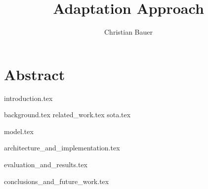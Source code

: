 \documentclass[
a4paper, %
11pt, %
onecolumn, %
openany, %
]{memoir}
\title{Adaptation Approach}
\author{Christian Bauer}
\begin{document}
  \maketitle

  \tableofcontents
  \listoffigures
  \lstlistoflistings

  \section*{Abstract}   




  {introduction.tex}

  {background.tex}
  {related_work.tex}
  {sota.tex}

  {model.tex}

  {architecture_and_implementation.tex}
  
  {evaluation_and_results.tex}

  {conclusions_and_future_work.tex}


  
  
\end{document}
